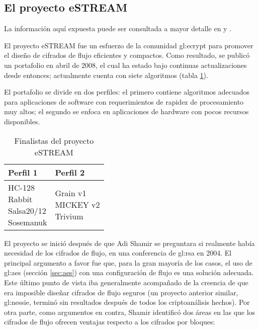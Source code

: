 %
%

\subsection{El proyecto eSTREAM}

La información aquí expuesta puede ser consultada a mayor detalle en
\cite{resultados_estream_1, resultados_estream_2} y \cite{estream_portafolio}.

El proyecto eSTREAM fue un esfuerzo de la comunidad \acrshort{gl:ecrypt} para
promover el diseño de cifrados de flujo eficientes y compactos. Como resultado,
se publicó un portafolio en abril de 2008, el cual ha estado bajo continuas
actualizaciones desde entonces; actualmente cuenta con siete algoritmos
(tabla \ref{portafolio_estream}).

El portafolio se divide en dos perfiles: el primero contiene algoritmos
adecuados para aplicaciones de software con requerimientos de rapidez de
procesamiento muy altos; el segundo se enfoca en aplicaciones de hardware con
pocos recursos disponibles.

\begin{table}
  \centering
  \begin{tabular}{| m{0.85in} | m{0.85in} |}
    \hline
    \textbf{Perfil 1} & \textbf{Perfil 2} \\ [0.5ex]
    \hline
    \makecell{HC-128 \\ Rabbit \\ Salsa20/12 \\ Sosemanuk} &
    \makecell{Grain v1 \\ MICKEY v2 \\ Trivium} \\
    \hline
  \end{tabular}
  \caption{Finalistas del proyecto eSTREAM}
  \label{portafolio_estream}
\end{table}

El proyecto se inició después de que Adi Shamir se preguntara si realmente
había necesidad de los cifrados de flujo, en una conferencia de
\acrshort{gl:rsa} en 2004. El principal argumento a favor fue que, para la gran
mayoría de los casos, el uso de \acrshort{gl:aes} (sección \ref{sec:aes}) con
una configuración de flujo es una solución adecuada. Este último punto de vista
iba generalmente acompañado de la creencia de que era imposible diseñar cifrados
de flujo seguros (un proyecto anterior similar, \acrshort{gl:nessie}, terminó
sin resultados después de todos los criptoanálisis hechos). Por otra parte,
como argumentos en contra, Shamir identificó dos áreas en las que los cifrados
de flujo ofrecen ventajas respecto a los cifrados por bloques:


